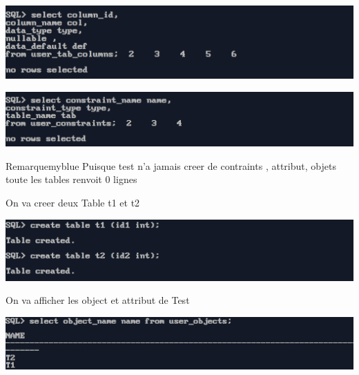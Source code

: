 

\begin{center}
    \includegraphics[width=\textwidth]{ScreenShot/Partie5/testatt1.png}
\end{center}




\begin{center}
    \includegraphics[width=\textwidth]{ScreenShot/Partie5/testconst1.png}
\end{center}

\begin{prettyBox}{Remarque}{myblue}
Puisque test n'a jamais creer de contraints , attribut, objets toute les tables renvoit 0 lignes
\end{prettyBox}

On va creer deux Table t1 et t2




\begin{center}
    \includegraphics[width=\textwidth]{ScreenShot/Partie5/tab.png}
\end{center}


On va afficher les object et attribut de Test


\begin{center}
    \includegraphics[width=\textwidth]{ScreenShot/Partie5/testobj2.png}
\end{center}



